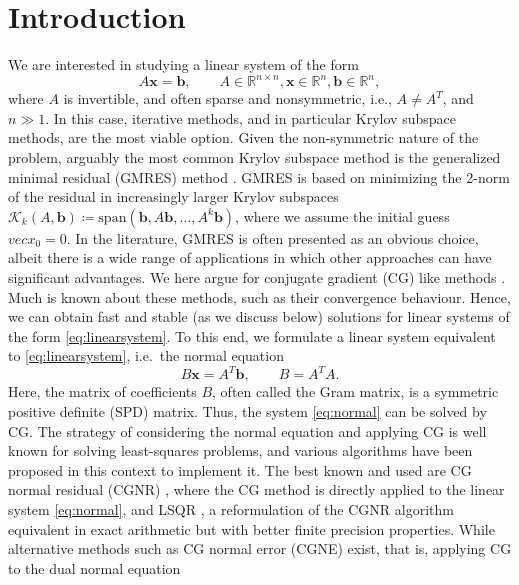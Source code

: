 \documentclass[hidelinks,onefignum,onetabnum]{siamart220329}
\let\vec\mathbf
\begin{document}
\section{Introduction}
We are interested in studying a linear system of the form
\begin{equation}
    \label{eq:linearsystem}
    A\vec{x} = \vec{b}, \qquad A \in \mathbb{R}^{n \times n}, \vec{x} \in \mathbb{R}^n, \vec{b} \in \mathbb{R}^n,
\end{equation}
where $A$ is invertible,
and often sparse and nonsymmetric, i.e., $A \neq A^T$, and $n\gg 1$. In this case, iterative methods, and in particular Krylov subspace methods, are the most viable option.
Given the non-symmetric nature of the problem, arguably the most common Krylov subspace method is the generalized minimal residual (GMRES) method \cite{Saad}. GMRES is based on minimizing the 2-norm of the residual in increasingly larger Krylov subspaces $\mathcal{K}_k(A,\vec{b}) \coloneq \text{span}(\vec{b},A\vec{b}, \dots , A^k\vec{b})$, where we assume the initial guess $vec{x}_0 = 0$. In the literature, GMRES is often presented as an obvious choice, albeit there is a wide range of applications in which other approaches can have significant advantages.
We here argue for conjugate gradient (CG) like methods \cite{Saad2,Trefethen,Trefethen2,Paige}. Much is known about these methods, such as their convergence behaviour. Hence, we can obtain fast and stable (as we discuss below)
solutions for linear systems of the form \eqref{eq:linearsystem}. To this end, we formulate a linear system equivalent to \eqref{eq:linearsystem}, i.e.~the normal equation
\begin{equation}
    \label{eq:normal}
    B\vec{x} = A^T\vec{b}, \qquad B = A^TA.
\end{equation}
Here, the matrix of coefficients $B$, often called the Gram matrix, is a symmetric positive definite (SPD) matrix. Thus, the system \eqref{eq:normal} can be solved by CG.
The strategy of considering the normal equation and applying CG is well known for solving least-squares problems, and various algorithms have been proposed in this context to implement it. The best known and used are CG normal residual (CGNR) \cite{Saad2}, where the CG method is directly applied to the linear system \eqref{eq:normal}, and LSQR \cite{Paige}, a reformulation of the CGNR algorithm equivalent in exact arithmetic but with better finite precision properties. While alternative methods such as CG normal error (CGNE) \cite{Saad2} exist, that is, applying CG to the dual normal equation
\end{document}
